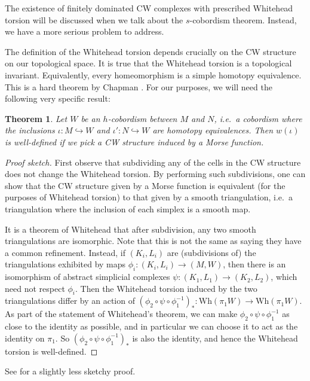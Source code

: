 \documentclass[a4paper, 12pt]{article}
\newtheorem{thm}{Theorem}[section]
\theoremstyle{definition}
\newcommand\Wh{\mathrm{Wh}}
\begin{document}
The existence of finitely dominated CW complexes with prescribed Whitehead torsion will be discussed when we talk about the $s$-cobordism theorem. Instead, we have a more serious problem to address.

The definition of the Whitehead torsion depends crucially on the CW structure on our topological space. It is true that the Whitehead torsion is a topological invariant. Equivalently, every homeomorphism is a simple homotopy equivalence. This is a hard theorem by Chapman \cite{chapman-topological-invariance}. For our purposes, we will need the following very specific result:
\begin{thm}
  Let $W$ be an $h$-cobordism between $M$ and $N$, i.e.\ a cobordism where the inclusions $\iota: M \hookrightarrow W$ and $\iota': N \hookrightarrow W$ are homotopy equivalences. Then $w(\iota)$ is well-defined if we pick a CW structure induced by a Morse function.
\end{thm}

\begin{proof}[Proof sketch]
  First observe that subdividing any of the cells in the CW structure does not change the Whitehead torsion. By performing such subdivisions, one can show that the CW structure given by a Morse function is equivalent (for the purposes of Whitehead torsion) to that given by a smooth triangulation, i.e.\ a triangulation where the inclusion of each simplex is a smooth map.

  It is a theorem of Whitehead that after subdivision, any two smooth triangulations are isomorphic. Note that this is not the same as saying they have a common refinement. Instead, if $(K_i, L_i)$ are (subdivisions of) the triangulations exhibited by maps $\phi_i: (K_i, L_i) \to (M, W)$, then there is an isomorphism of abstract simplicial complexes $\psi: (K_1, L_1) \to (K_2, L_2)$, which need not respect $\phi_i$. Then the Whitehead torsion induced by the two triangulations differ by an action of $(\phi_2 \circ \psi \circ \phi_1^{-1})_* : \Wh(\pi_1W) \to \Wh(\pi_1W)$. As part of the statement of Whitehead's theorem, we can make $\phi_2 \circ \psi \circ \phi_1^{-1}$ as close to the identity as possible, and in particular we can choose it to act as the identity on $\pi_1$. So $(\phi_2 \circ \psi \circ \phi_1^{-1})_*$ is also the identity, and hence the Whitehead torsion is well-defined.
\end{proof}
See \cite{milnor-whitehead-torsion} for a slightly less sketchy proof.
\end{document}
